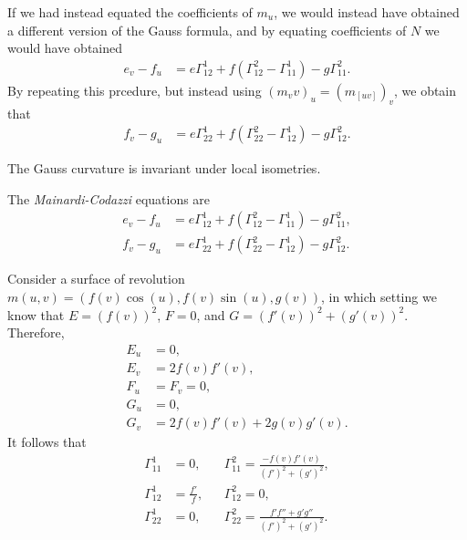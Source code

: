 \begin{rmk}
    If we had instead equated the coefficients of $m_u$, we would instead have obtained a different version of the Gauss formula, and by equating coefficients of $N$ we would have obtained
    \begin{align}
        e_v - f_u &= e\Gamma_{12}^{1} + f\left(\Gamma_{12}^{2} - \Gamma_{11}^{1}\right) - g\Gamma_{11}^2.
    \end{align}
    By repeating this prcedure, but instead using $(m_vv)_u = (m_[uv])_v$, we obtain that
    \begin{align*}
        f_v - g_u &= e\Gamma_{22}^{1} + f(\Gamma_{22}^{2} - \Gamma_{12}^{1}) - g\Gamma_{12}^{2}.
    \end{align*}
\end{rmk}

\begin{cor}
    The Gauss curvature is invariant under local isometries.
\end{cor}

\begin{defn}
    The \emph{Mainardi-Codazzi} equations are
    \begin{align*}
        e_v - f_u &= e\Gamma_{12}^{1} + f\left(\Gamma_{12}^{2}-\Gamma_{11}^{1}\right) - g\Gamma_{11}^2, \\
        f_v - g_u &= e\Gamma_{22}^{1} + f\left(\Gamma_{22}^{2}-\Gamma_{12}^{1}\right) - g\Gamma_{12}^2.
    \end{align*}
\end{defn}

\begin{exmp}
    Consider a surface of revolution $m(u, v) = (f(v)\cos(u), f(v)\sin(u), g(v))$, in which setting we know that $E = (f(v))^2$, $F = 0$, and $G = (f'(v))^2 + (g'(v))^2$. Therefore,
    \begin{align*}
        E_u &= 0, \\
        E_v &= 2f(v)f'(v), \\
        F_u &= F_v = 0, \\
        G_u &= 0, \\
        G_v &= 2f(v)f'(v) + 2g(v)g'(v).
    \end{align*}
    It follows that
    \begin{align*}
        \Gamma_{11}^{1} &= 0, &&\Gamma_{11}^{2} = \frac{-f(v)f'(v)}{(f')^2 + (g')^2}, \\
        \Gamma_{12}^{1} &= \frac{f'}{f}, &&\Gamma_{12}^{2} = 0, \\
        \Gamma_{22}^{1} &= 0, &&\Gamma_{22}^{2} = \frac{f'f'' + g'g''}{(f')^2 + (g')^2}.
    \end{align*}
\end{exmp}

